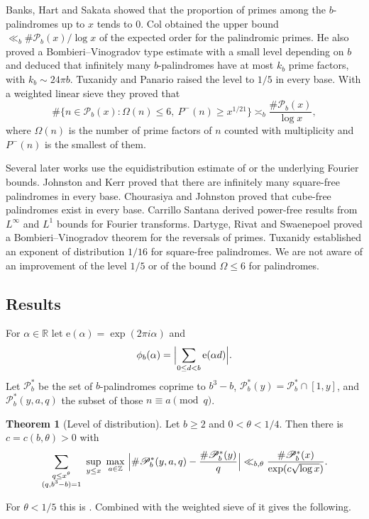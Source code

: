 \documentclass[11pt]{amsart}
\theoremstyle{definition}
\newtheorem{theorem}{Theorem}[section]
\numberwithin{equation}{section}
\newcommand{\e}{\mathrm{e}}
\newcommand{\R}{\mathbb{R}}
\newcommand{\Z}{\mathbb{Z}}
\newcommand{\PP}{\mathscr{P}}
\begin{document}
Banks, Hart and Sakata \cite{BHS} showed that the proportion of primes among the $b$-palindromes up to $x$ tends to $0$. Col \cite{Col} obtained the upper bound $\ll_b\#\PP_b(x)/\log x$ of the expected order for the palindromic primes. He also proved a Bombieri--Vinogradov type estimate with a small level depending on $b$ and deduced that infinitely many $b$-palindromes have at most $k_b$ prime factors, with $k_b\sim24\pi b$. Tuxanidy and Panario \cite{TP} raised the level to $1/5$ in every base. With a weighted linear sieve they proved that
\[
\#\{n\in\PP_b(x):\Omega(n)\le 6,\ P^-(n)\ge x^{1/21}\}\asymp_b\frac{\#\PP_b(x)}{\log x},
\]
where $\Omega(n)$ is the number of prime factors of $n$ counted with multiplicity and $P^-(n)$ is the smallest of them.

Several later works use the equidistribution estimate of \cite{TP} or the underlying Fourier bounds. Johnston and Kerr \cite{JK} proved that there are infinitely many square-free palindromes in every base. Chourasiya and Johnston \cite{CJ} proved that cube-free palindromes exist in every base. Carrillo Santana \cite{CS} derived power-free results from $L^\infty$ and $L^1$ bounds for Fourier transforms. Dartyge, Rivat and Swaenepoel \cite{DRS} proved a Bombieri--Vinogradov theorem for the reversals of primes. Tuxanidy \cite{Tux} established an exponent of distribution $1/16$ for square-free palindromes. We are not aware of an improvement of the level $1/5$ or of the bound $\Omega\le6$ for palindromes.

\subsection{Results}

For $\alpha\in\R$ let $\e(\alpha)=\exp(2\pi i\alpha)$ and
\[
\phi_b(\alpha)=\Bigl|\sum_{0\le d<b}\e(\alpha d)\Bigr|.
\]
Let $\PP_b^*$ be the set of $b$-palindromes coprime to $b^3-b$, $\PP_b^*(y)=\PP_b^*\cap[1,y]$, and $\PP_b^*(y,a,q)$ the subset of those $n\equiv a\pmod q$.

\begin{theorem}[Level of distribution]\label{thm:level}
Let $b\ge2$ and $0<\theta<1/4$. Then there is $c=c(b,\theta)>0$ with
\[
\sum_{\substack{q\le x^{\theta}\\(q,b^3-b)=1}}\ \sup_{y\le x}\ \max_{a\in\Z}\ \Bigl|\#\PP_b^*(y,a,q)-\frac{\#\PP_b^*(y)}{q}\Bigr|\ll_{b,\theta}\frac{\#\PP_b^*(x)}{\exp(c\sqrt{\log x})}.
\]
\end{theorem}

For $\theta<1/5$ this is \cite[Thm.~1.5]{TP}. Combined with the weighted sieve of \cite{TP} it gives the following.
\end{document}

